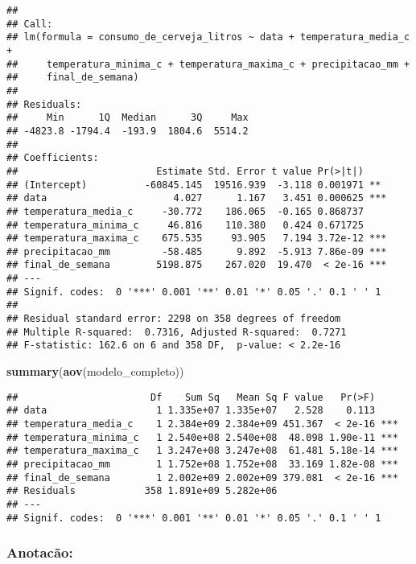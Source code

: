 \documentclass[
]{article}
\newenvironment{Shaded}{\begin{snugshade}}{\end{snugshade}}
\newcommand{\FunctionTok}[1]{\textcolor[rgb]{0.13,0.29,0.53}{\textbf{#1}}}
\newcommand{\NormalTok}[1]{#1}
\begin{document}
\begin{verbatim}
## 
## Call:
## lm(formula = consumo_de_cerveja_litros ~ data + temperatura_media_c + 
##     temperatura_minima_c + temperatura_maxima_c + precipitacao_mm + 
##     final_de_semana)
## 
## Residuals:
##     Min      1Q  Median      3Q     Max 
## -4823.8 -1794.4  -193.9  1804.6  5514.2 
## 
## Coefficients:
##                        Estimate Std. Error t value Pr(>|t|)    
## (Intercept)          -60845.145  19516.939  -3.118 0.001971 ** 
## data                      4.027      1.167   3.451 0.000625 ***
## temperatura_media_c     -30.772    186.065  -0.165 0.868737    
## temperatura_minima_c     46.816    110.380   0.424 0.671725    
## temperatura_maxima_c    675.535     93.905   7.194 3.72e-12 ***
## precipitacao_mm         -58.485      9.892  -5.913 7.86e-09 ***
## final_de_semana        5198.875    267.020  19.470  < 2e-16 ***
## ---
## Signif. codes:  0 '***' 0.001 '**' 0.01 '*' 0.05 '.' 0.1 ' ' 1
## 
## Residual standard error: 2298 on 358 degrees of freedom
## Multiple R-squared:  0.7316, Adjusted R-squared:  0.7271 
## F-statistic: 162.6 on 6 and 358 DF,  p-value: < 2.2e-16
\end{verbatim}

\begin{Shaded}
\begin{Highlighting}[]
\FunctionTok{summary}\NormalTok{(}\FunctionTok{aov}\NormalTok{(modelo\_completo))}
\end{Highlighting}
\end{Shaded}

\begin{verbatim}
##                       Df    Sum Sq   Mean Sq F value   Pr(>F)    
## data                   1 1.335e+07 1.335e+07   2.528    0.113    
## temperatura_media_c    1 2.384e+09 2.384e+09 451.367  < 2e-16 ***
## temperatura_minima_c   1 2.540e+08 2.540e+08  48.098 1.90e-11 ***
## temperatura_maxima_c   1 3.247e+08 3.247e+08  61.481 5.18e-14 ***
## precipitacao_mm        1 1.752e+08 1.752e+08  33.169 1.82e-08 ***
## final_de_semana        1 2.002e+09 2.002e+09 379.081  < 2e-16 ***
## Residuals            358 1.891e+09 5.282e+06                     
## ---
## Signif. codes:  0 '***' 0.001 '**' 0.01 '*' 0.05 '.' 0.1 ' ' 1
\end{verbatim}

\hypertarget{anotacuxe3o}{%
\subsubsection{Anotacão:}\label{anotacuxe3o}}
\end{document}

